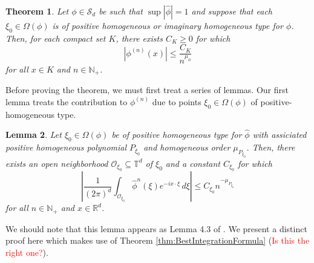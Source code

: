 \documentclass[11pt]{article}
\newtheorem{theorem}{Theorem}[section]
\newtheorem{lemma}[theorem]{Lemma}
\begin{document}
\begin{theorem}
Let $\phi\in\mathcal{S}_d$ be such that $\sup |\widehat{\phi}|=1$ and suppose that each $\xi_0\in\Omega(\phi)$ is of positive homogeneous or imaginary homogeneous type for $\phi$. Then, for each compact set $K$, there exists $C_K\geq 0$ for which
\begin{equation*}
    \left|\phi^{(n)}(x)\right|\leq\frac{C_K}{n^{\mu_\phi}}
\end{equation*}
for all $x\in K$ and $n\in\mathbb{N}_+$.
\end{theorem}
\noindent Before proving the theorem, we must first treat a series of lemmas. Our first lemma treats the contribution to $\phi^{(n)}$ due to points $\xi_0\in \Omega(\phi)$ of positive-homogeneous type. 
\begin{lemma}\label{lem:EstPosHom}
Let $\xi_0\in\Omega(\phi)$ be of positive homogeneous type for $\widehat{\phi}$ with assiciated positive homogeneous polynomial $P_{\xi_0}$ and homogeneous order $\mu_{P_{\xi_0}}$. Then, there exists an open neighborhood $\mathcal{O}_{\xi_0}\subseteq\mathbb{T}^d$ of $\xi_0$ and a constant $C_{\xi_0}$ for which
\begin{equation*}
    \left|\frac{1}{(2\pi)^d}\int_{\mathcal{O}_{\xi_0}}\widehat{\phi}^n(\xi)e^{-ix\cdot\xi}\,d\xi\right|\leq %
    C_{\xi_0} n^{-\mu_{P_{\xi_0}}}
\end{equation*}
for all $n\in\mathbb{N}_+$ and $x\in\mathbb{R}^d$.
\end{lemma}
We should note that this lemma appears as Lemma 4.3 of \cite{Randles2017}. We present a distinct proof here which makes use of Theorem \ref{thm:BestIntegrationFormula} (\textcolor{red}{Is this the right one?}).
\end{document}
